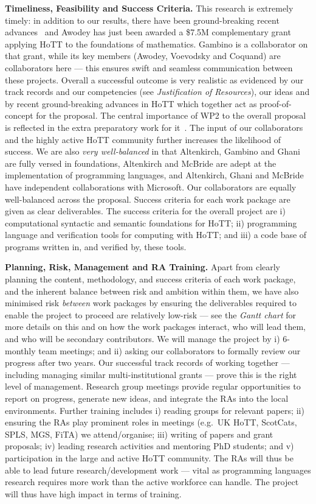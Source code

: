 \documentclass[a4paper,11pt]{article}
\newcommand{\eg}{{e.g.}\ }
\begin{document}
{\bf Timeliness, Feasibility and Success Criteria.}  This research is
extremely timely: in addition to our results, there have been
ground-breaking recent advances~\cite{ShulmanM:uniidh,BezemM:cubsmt,
  nominal} and Awodey has just been awarded a \$7.5M complementary
grant applying HoTT to the foundations of mathematics. Gambino is a
collaborator on that grant, while its key members (Awodey, Voevodsky
and Coquand) are collaborators here --- this ensures swift and
seamless communication between these projects.  Overall a successful
outcome is very realistic as evidenced by our track records and our
competencies (see {\em Justification of Resources}), our ideas and by
recent ground-breaking advances in HoTT which together act as
proof-of-concept for the proposal. The central importance of WP2 to
the overall proposal is reflected in the extra preparatory work for
it~\cite{alti-ctt,txa-ihp14}.  The input of our collaborators and the
highly active HoTT community further increases the likelihood of
success. We are also {\em very well-balanced} in that Altenkirch,
Gambino and Ghani are fully versed in foundations, Altenkirch and
McBride are adept at the implementation of programming languages, and
Altenkirch, Ghani and McBride have independent collaborations with
Microsoft. Our collaborators are equally well-balanced across the
proposal. Success criteria for each work package are given as clear
deliverables. The success criteria for the overall project are i)
computational syntactic and semantic foundations for HoTT; ii)
programming language and verification tools for computing with HoTT;
and iii) a code base of programs written in, and verified by, these
tools.


{\bf Planning, Risk, Management and RA Training.} Apart from clearly
planning the content, methodology, and success criteria of each work
package, and the inherent balance between risk and ambition within
them, we have also minimised risk {\em between} work packages by
ensuring the deliverables required to enable the project to proceed
are relatively low-risk --- see the {\em Gantt chart} for more details on
this and on how the work packages interact, who will lead them, and
who will be secondary contributors. We will manage the project by i)
6-monthly team meetings; and ii) asking our collaborators to formally
review our progress after two years.  Our successful
track records of working together --- including managing similar
multi-institutional grants --- prove this is the right level of
management. Research group meetings provide regular opportunities to
report on progress, generate new ideas, and integrate the RAs into the
local environments. Further training includes i) reading groups for
relevant papers; ii) ensuring the RAs play prominent roles in meetings
(\eg UK HoTT, ScotCats, SPLS, MGS, FiTA) we attend/organise; iii)
writing of papers and grant proposals; iv) leading research activities
and mentoring PhD students; and v) participation in the large and
active HoTT community. The RAs will thus be able to lead future
research/development work --- vital as programming languages research
requires more work than the active workforce can handle. The
project will thus have high impact in terms of training.
\end{document}
